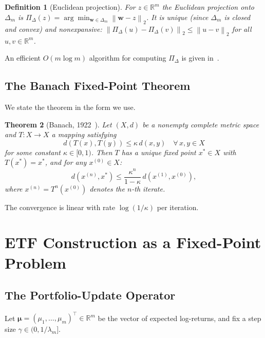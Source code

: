 \documentclass[twocolumn,11pt,a4paper]{article}
\newtheorem{theorem}{Theorem}[section]
\newtheorem{definition}[theorem]{Definition}
\theoremstyle{remark}
\newcommand{\R}{\mathbb{R}}
\newcommand{\bw}{\mathbf{w}}
\newcommand{\bmu}{\bm{\mu}}
\newcommand{\Dm}{\Delta_m}
\newcommand{\lam}[1]{\lambda_{#1}}
\newcommand{\kap}{\kappa}
\newcommand{\norm}[1]{\left\lVert #1 \right\rVert_2}
\newcommand{\Proj}{\Pi_\Delta}
\begin{document}
\begin{definition}[Euclidean projection]
\label{def:proj}
For $z\in\R^m$ the \emph{Euclidean projection onto $\Dm$} is
$\Proj(z) = \arg\min_{\bw\in\Dm}\norm{\bw - z}$.
It is unique (since $\Dm$ is closed and convex) and nonexpansive:
$\norm{\Proj(u)-\Proj(v)} \leq \norm{u-v}$ for all $u,v\in\R^m$.
\end{definition}

An efficient $O(m\log m)$ algorithm for computing $\Proj$ is given
in~\cite{duchi2008}.

\subsection{The Banach Fixed-Point Theorem}

We state the theorem in the form we use.

\begin{theorem}[Banach, 1922~\cite{banach1922}]
\label{thm:banach}
Let $(X,d)$ be a nonempty complete metric space and $T:X\to X$ a mapping
satisfying
\begin{equation}
  d(T(x),T(y)) \leq \kap\, d(x,y) \quad \forall\, x,y\in X
\end{equation}
for some constant $\kap\in[0,1)$. Then $T$ has a unique fixed point
$x^*\in X$ with $T(x^*)=x^*$, and for any $x^{(0)}\in X$:
\begin{equation}
  d(x^{(n)},x^*) \leq \frac{\kap^n}{1-\kap}\,d(x^{(1)},x^{(0)}),
\end{equation}
where $x^{(n)} = T^n(x^{(0)})$ denotes the $n$-th iterate.
\end{theorem}

The convergence is linear with rate $\log(1/\kap)$ per iteration.


\section{ETF Construction as a Fixed-Point Problem}
\label{sec:contraction}

\subsection{The Portfolio-Update Operator}

Let $\bmu = (\mu_1,\ldots,\mu_m)^\top \in \R^m$ be the vector of expected
log-returns, and fix a step size $\gamma \in (0, 1/\lam{m}]$.
\end{document}
